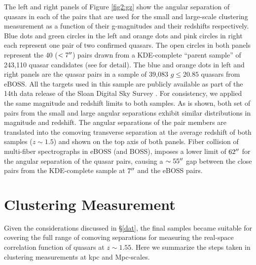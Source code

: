 \documentclass[useAMS,usenatbib]{mn2e}
\begin{document}
The left and right panels of Figure \ref{fig2:gz} show the angular separation of quasars in each of the pairs that are 
used for the small and large-scale clustering measurement as a function of their 
g-magnitudes and their redshifts respectively. Blue dots and green circles in 
the left and orange dots and pink circles in right each represent one pair of 
two confirmed quasars. The open circles in both panels represent the 40 ($< 7 
\arcsec$) pairs drawn from a KDE-complete ``parent sample'' of  243{,}110 quasar 
candidates (see \citet{ef17} for detail). The blue and orange dots in left and 
right panels are the quasar pairs in a sample of 39{,}083 $g\le 20.85$ quasars 
from eBOSS. All the targets used in this sample are publicly available as part of the 14th data release of the Sloan Digital Sky Survey \citep[DR14; ][]{dr14}. For consistency, we applied the same magnitude and redshift limits to both samples. 
As is shown, both set of pairs from the small and large angular separations 
exhibit similar distributions in magnitude and redshift. 
The angular separations of the pair members are translated into the 
comoving transverse separation at the average redshift of both samples ($z\sim 
1.5$) and shown on the top axis of both panels. Fiber collision of multi-fiber 
spectrographs in eBOSS (and BOSS), imposes a lower limit of $62\arcsec$ for the 
angular separation of the quasar pairs, causing a $\sim 55\arcsec$ gap between 
the close pairs from the KDE-complete sample at $7\arcsec$ and the eBOSS 
pairs.


\section{Clustering Measurement}\label{cls}
Given the considerations discussed in \S\ref{dat}, the final samples became 
suitable for covering the full range of comoving separations for measuring the 
real-space correlation function of quasars at $z\sim 1.55$.  Here we summarize 
the steps taken in clustering measurements at kpc and Mpc-scales. 
\end{document}
